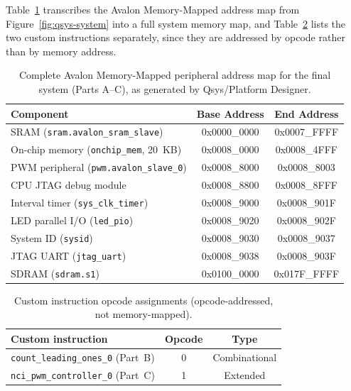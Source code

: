 \documentclass[
    12pt,
    a4paper
]{report}
\begin{document}
Table~\ref{tab:full-memmap} transcribes the Avalon Memory-Mapped address map from
Figure~\ref{fig:qsys-system} into a full system memory map, and Table~\ref{tab:opcodes} lists the
two custom instructions separately, since they are addressed by opcode rather than by memory
address.

\begin{table}[H]
    \centering
    \caption{Complete Avalon Memory-Mapped peripheral address map for the final system (Parts
    A--C), as generated by Qsys/Platform Designer.}
    \label{tab:full-memmap}
    \begin{tabular}{lcc}
        \toprule
        Component & Base Address & End Address \\
        \midrule
        SRAM (\texttt{sram.avalon\_sram\_slave})      & 0x0000\_0000 & 0x0007\_FFFF \\
        On-chip memory (\texttt{onchip\_mem}, 20~KB)  & 0x0008\_0000 & 0x0008\_4FFF \\
        PWM peripheral (\texttt{pwm.avalon\_slave\_0}) & 0x0008\_8000 & 0x0008\_8003 \\
        CPU JTAG debug module                          & 0x0008\_8800 & 0x0008\_8FFF \\
        Interval timer (\texttt{sys\_clk\_timer})      & 0x0008\_9000 & 0x0008\_901F \\
        LED parallel I/O (\texttt{led\_pio})            & 0x0008\_9020 & 0x0008\_902F \\
        System ID (\texttt{sysid})                      & 0x0008\_9030 & 0x0008\_9037 \\
        JTAG UART (\texttt{jtag\_uart})                 & 0x0008\_9038 & 0x0008\_903F \\
        SDRAM (\texttt{sdram.s1})                        & 0x0100\_0000 & 0x017F\_FFFF \\
        \bottomrule
    \end{tabular}
\end{table}

\begin{table}[H]
    \centering
    \caption{Custom instruction opcode assignments (opcode-addressed, not memory-mapped).}
    \label{tab:opcodes}
    \begin{tabular}{lcc}
        \toprule
        Custom instruction & Opcode & Type \\
        \midrule
        \texttt{count\_leading\_ones\_0} (Part~B) & 0 & Combinational \\
        \texttt{nci\_pwm\_controller\_0} (Part~C)  & 1 & Extended \\
        \bottomrule
    \end{tabular}
\end{table}
\end{document}
